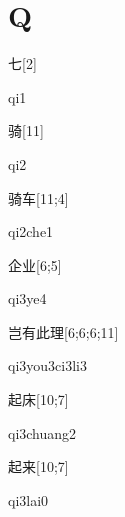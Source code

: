 ﻿%
\section*{Q}

\begin{verbete}[qi1]{七}[2]
\begin{pronuncia}{qi1}
\end{pronuncia}
\end{verbete}

\begin{verbete}[qi2]{骑}[11]
\begin{pronuncia}{qi2}
\end{pronuncia}
\end{verbete}

\begin{verbete}[qi2che1]{骑车}[11;4]
\begin{pronuncia}{qi2che1}
\end{pronuncia}
\end{verbete}

\begin{verbete}[qi3ye4]{企业}[6;5]
\begin{pronuncia}{qi3ye4}
\end{pronuncia}
\end{verbete}

\begin{verbete}[qi3you3ci3li3]{岂有此理}[6;6;6;11]
  \begin{pronuncia}[\\]{qi3you3ci3li3}
\end{pronuncia}
\end{verbete}

\begin{verbete}[qi3chuang2]{起床}[10;7]
\begin{pronuncia}{qi3chuang2}
\end{pronuncia}
\end{verbete}

\begin{verbete}[qi3lai0]{起来}[10;7]
\begin{pronuncia}{qi3lai0}
\end{pronuncia}
\end{verbete}


